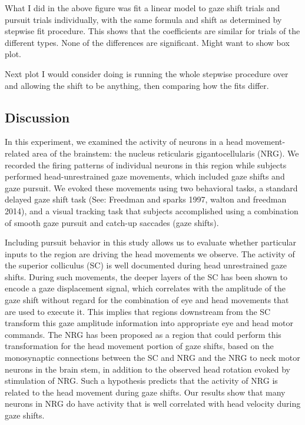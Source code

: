 \documentclass[]{article}
\begin{document}
What I did in the above figure was fit a linear model to gaze shift
trials and pursuit trials individually, with the same formula and shift
as determined by stepwise fit procedure. This shows that the
coefficients are similar for trials of the different types. None of the
differences are significant. Might want to show box plot.

Next plot I would consider doing is running the whole stepwise procedure
over and allowing the shift to be anything, then comparing how the fits
differ.

\subsection{Discussion}\label{discussion}

In this experiment, we examined the activity of neurons in a head
movement-related area of the brainstem: the nucleus reticularis
gigantocellularis (NRG). We recorded the firing patterns of individual
neurons in this region while subjects performed head-unrestrained gaze
movements, which included gaze shifts and gaze pursuit. We evoked these
movements using two behavioral tasks, a standard delayed gaze shift task
(See: Freedman and sparks 1997, walton and freedman 2014), and a visual
tracking task that subjects accomplished using a combination of smooth
gaze pursuit and catch-up saccades (gaze shifts).

Including pursuit behavior in this study allows us to evaluate whether
particular inputs to the region are driving the head movements we
observe. The activity of the superior colliculus (SC) is well documented
during head unrestrained gaze shifts. During such movements, the deeper
layers of the SC has been shown to encode a gaze displacement signal,
which correlates with the amplitude of the gaze shift without regard for
the combination of eye and head movements that are used to execute it.
This implies that regions downstream from the SC transform this gaze
amplitude information into appropriate eye and head motor commands. The
NRG has been proposed as a region that could perform this transformation
for the head movement portion of gaze shifts, based on the monosynaptic
connections between the SC and NRG and the NRG to neck motor neurons in
the brain stem, in addition to the observed head rotation evoked by
stimulation of NRG. Such a hypothesis predicts that the activity of NRG
is related to the head movement during gaze shifts. Our results show
that many neurons in NRG do have activity that is well correlated with
head velocity during gaze shifts.
\end{document}

